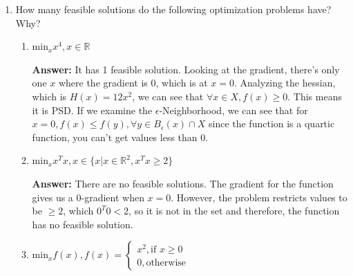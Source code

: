 \documentclass{assignment}
\newcommand{\R}{\mathbb{R}}
\begin{document}
\begin{problem}
\begin{enumerate}

        
    \item How many feasible solutions do the following optimization problems have? Why?

    \begin{enumerate}[label=(\alph*)]


        
        \item $\text{min}_x x^4, x \in \R$

        \color{blue}\textbf{Answer:} It has 1 feasible solution. Looking at the gradient, there's only one $x$ where the gradient is 0, which is at $x = 0$. Analyzing the hessian, which is $H(x) = 12x^2$, we can see that $\forall x \in X, f(x) \geq 0$. This means it is PSD. If we examine the $\epsilon$-Neighborhood, we can see that for $x = 0, f(x) \leq f(y), \forall y \in B_\epsilon(x) \cap X$ since the function is a quartic function, you can't get values less than 0. \color{black}


        
        \item $\text{min}_x x^Tx, x \in \{x | x \in \R^2, x^Tx \geq 2\}$

        \color{blue}\textbf{Answer:} There are no feasible solutions. The gradient for the function gives us a 0-gradient when $x = 0$. However, the problem restricts values to be $\geq 2$, which $0^T0 < 2$, so it is not in the set and therefore, the function has no feasible solution. \color{black}


        
        \item $\text{min}_x f(x), f(x) = \begin{cases}
            x^2, \text{if } x \geq 0 \\
            0, \text{otherwise} 
        \end{cases} $


\end{enumerate}
\end{enumerate}
\end{problem}
\end{document}
